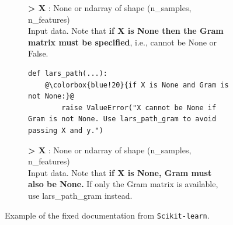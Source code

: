 \begin{figure}[t]
    \vspace{2mm}
    \begin{subfigure}{\linewidth}
        \begin{tcolorbox}[fontupper=\footnotesize,fonttitle=\small,colback=Emerald!10,colframe=cyan!40!black,title=\textbf{Constraint description of \texttt{X} and \texttt{Gram} in function \texttt{lars\_path}}]
            {\sffamily \textbf{> X } : None or ndarray of shape (n\_samples, n\_features)
            \\
            Input data. Note that \colorbox{blue!20}{\textbf{if X is None then the Gram matrix must be specified}}, i.e., cannot be None or False.}
        \end{tcolorbox}
        \label{fig:eg3-doc}
    \end{subfigure}
    \begin{subfigure}{\linewidth}
\begin{tcolorbox}[fontupper=\footnotesize,fonttitle=\small,colback=Salmon!20, colframe=Salmon!90!Black,title=\textbf{Corresponding code snippet in function \texttt{lars\_path}}]
\begin{lstlisting}[escapechar=@,basicstyle={\footnotesize\ttfamily}]
def lars_path(...):
    @\colorbox{blue!20}{if X is None and Gram is not None:}@
        raise ValueError("X cannot be None if Gram is not None. Use lars_path_gram to avoid passing X and y.")
\end{lstlisting}
\end{tcolorbox}
        \label{fig:eg3-code}
    \end{subfigure}
     \begin{subfigure}{\linewidth}
        \begin{tcolorbox}[fontupper=\footnotesize,fonttitle=\small,colback=Emerald!10,colframe=LimeGreen!60!black,title=\textbf{Fixed Constraint description of \texttt{X} and \texttt{Gram} in function \texttt{lars\_path}}]
            {\sffamily \textbf{> X } : None or ndarray of shape (n\_samples, n\_features)
                \\
            Input data. Note that \colorbox{blue!20}{\textbf{if X is None, Gram must also be None.}} If only the Gram matrix is available, use lars\_path\_gram instead.}
        \end{tcolorbox}
        \label{fig:eg3-fixed-doc}
    \end{subfigure}
    \caption{Example of the fixed documentation from \texttt{Scikit-learn}.}
    \label{fig:eg3}
    \vspace{-10pt}
\end{figure}


